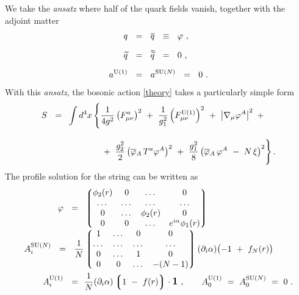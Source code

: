 \documentclass[12pt]{article}
\newcommand{\p}{\partial}
\newcommand{\wt}{\widetilde}
\newcommand{\ov}{\overline}
\newcommand{\lgr}{\left\lgroup}
\newcommand{\rgr}{\right\rgroup}
\newcommand{\aU}{a^{\rm U(1)}}
\newcommand{\aN}{a^\text{SU($N$)}}
\begin{document}
	We take the {\it ansatz} where half of the quark fields vanish, together with the adjoint matter
\begin{align*}
%
	q       & ~~=~~ \ov{q} ~~\equiv~~ \varphi~,  \\[2mm]
%
	\wt{q}  & ~~=~~ \ov{\wt{q}} ~~=~~ 0~, \\[2mm]
%
	\aU     & ~~=~~ \aN ~~=~~ 0~. 
\end{align*}
	With this {\it ansatz}, the bosonic action \eqref{theory} takes a particularly simple form
\begin{align}
%
\notag
	S ~~=~~ & \int d^4x\, 
	\Biggl\{  \frac{1}{4g^2}\left( F_{\mu\nu}^a \right)^2  ~+~ 
		 \frac{1}{g_1^2}\left( F_{\mu\nu}^{\rm U(1)} \right)^2 ~+~
		 \left| \nabla_\mu \varphi^A \right|^2 ~+~ \\[3mm]
%
\label{redmodel}
	        & \phantom{ \int d^4x\, \Biggl\{ }
		~+~
		 \frac{g_2^2}{2} \left( \ov{\varphi}{}_A\,T^a\varphi^A \right)^2 ~+~
		 \frac{g_1^2}{8} \left( \ov{\varphi}{}_A\, \varphi^A ~-~ N\,\xi \right)^2
	\Biggr\} \,.
\end{align}
	The profile solution for the string can be written as \cite{ABEKY}
\begin{align}
%
\notag
	\varphi   ~~=~~  &
		\lgr \begin{matrix}
			\phi_2(r) & 0     & \dots      & 0      \\
			\dots     & \dots & \dots      & \dots  \\
			0         & \dots & \phi_2(r)  & 0      \\
			0         &  0    & \dots      & e^{i\alpha}\phi_1(r) 
		     \end{matrix} \rgr
	\\
%
\label{string_reg}
	\\[-0.7cm]
%
\notag
	A_i^\text{SU($N$)}  ~~=~~
		\frac{1}{N} & \lgr \begin{matrix}
        			    	1       &   \dots   &  0       &   0   \\
        				\dots   &   \dots   &  \dots   & \dots \\
        				0       &   \dots   &  1       &   0   \\
        				0       &     0     &  \dots   & - (N-1) 
	   		         \end{matrix} \rgr
		(\p_i\alpha)\bigl( -1 ~+~ f_{N}(r) \bigr)
	\\
%
\notag
	A_i^{\rm U(1)}  ~~=~~ & \frac{1}{N}(\p_i\alpha)\lgr 1 ~-~ f(r) \rgr \cdot \mathlarger{\mathbf{1}}~,
	\qquad 
	A_0^{\rm U(1)} ~=~ A_0^\text{SU($N$)} ~=~ 0~.
\end{align}
\end{document}
